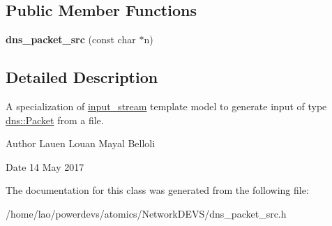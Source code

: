 \subsection*{Public Member Functions}
\begin{DoxyCompactItemize}
\item 
{\bfseries dns\+\_\+packet\+\_\+src} (const char $\ast$n)\hypertarget{classdns__packet__src_a6b057e9ffb6aa7fbbf52262e34a6d85c}{}\label{classdns__packet__src_a6b057e9ffb6aa7fbbf52262e34a6d85c}

\end{DoxyCompactItemize}


\subsection{Detailed Description}
A specialization of \hyperlink{classinput__stream}{input\+\_\+stream} template model to generate input of type \hyperlink{structdns_1_1Packet}{dns\+::\+Packet} from a file. 

\begin{DoxyAuthor}{Author}
Lauen Louan Mayal Belloli 
\end{DoxyAuthor}
\begin{DoxyDate}{Date}
14 May 2017 
\end{DoxyDate}


The documentation for this class was generated from the following file\+:\begin{DoxyCompactItemize}
\item 
/home/lao/powerdevs/atomics/\+Network\+D\+E\+V\+S/dns\+\_\+packet\+\_\+src.\+h\end{DoxyCompactItemize}
